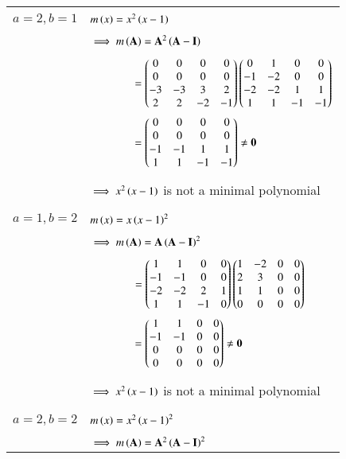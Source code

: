 \documentclass[journal,12pt]{IEEEtran}
\begin{document}
\begin{longtable}{|c|l|}
	\multirow{3}{*}{$a=2,b=1$} & \\
	&$m\left(x\right)=x^2\left(x-1\right)$\\
	&\\
	& $\implies m\brak{\vec{A}}=\vec{A}^2\brak{\Vec{A}-\vec{I}}$\\
	&\\
	& $\qquad \qquad=\begin{pmatrix}0&0&0&0\\0&0&0&0\\-3&-3&3&2\\2&2&-2&-1\end{pmatrix}\begin{pmatrix}0&1&0&0\\-1&-2&0&0\\-2&-2&1&1\\1&1&-1&-1\end{pmatrix}$\\
	& $\qquad \qquad = \myvec{0&0&0&0\\0&0&0&0\\-1&-1&1&1\\1&1&-1&-1}\neq\Vec{0}$\\
	&\\
	&$\implies x^2\left(x-1\right)$ is not a minimal polynomial\\
	&\\
	\hline
	\multirow{3}{*}{$a=1,b=2$} & \\
	&$m\left(x\right)=x\left(x-1\right)^2$\\
	&\\
	& $\implies m\brak{\vec{A}}=\vec{A}\brak{\Vec{A}-\vec{I}}^2$\\
	&\\
	& $\qquad\qquad=\begin{pmatrix}1&1&0&0\\-1&-1&0&0\\-2&-2&2&1\\1&1&-1&0\end{pmatrix}\begin{pmatrix}1&-2&0&0\\2&3&0&0\\1&1&0&0\\0&0&0&0\end{pmatrix}$\\
	& $\qquad\qquad = \myvec{1&1&0&0\\-1&-1&0&0\\0&0&0&0\\0&0&0&0}\neq\Vec{0}$\\
	&\\
	&$\implies x^2\left(x-1\right)$ is not a minimal polynomial\\
	&\\
	\hline
	\multirow{3}{*}{$a=2,b=2$} & \\
	&$m\left(x\right)=x^2\left(x-1\right)^2$\\
	&\\
	&$\implies m\brak{\vec{A}}=\vec{A}^2\brak{\Vec{A}-\vec{I}}^2$\\

\end{longtable}
\end{document}
